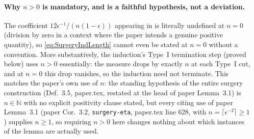 \begin{lemma}
  \paragraph{Why $n>0$ is mandatory, and is a faithful hypothesis, not a deviation.} The
  coefficient $12\epsilon^{-1}/(n(1-\epsilon))$ appearing in  is literally
  undefined at $n=0$ (division by zero in a context where the paper intends a genuine positive
  quantity), so \eqref{eq:SurgeryIndLength} cannot even be stated at $n=0$ without a convention. More
  substantively, the induction's Type~I termination step (proved below) uses
  $n>0$ essentially: the measure drops by exactly $n$ at each Type~I cut, and at $n=0$ this drop
  vanishes, so the induction need not terminate. This matches the paper's own use of $n$: the
  standing hypothesis of the entire surgery construction (Def.~3.5, paper.tex, restated at the head
  of paper Lemma~3.1) is $n \in \mathbb{N}$ with no explicit positivity clause stated, but every
  citing use of paper Lemma~3.1 (paper Cor.~3.2, \texttt{surgery-eta}, paper.tex line 628, with
  $n = \lceil \epsilon^{-2}\rceil \ge 1$) supplies $n \ge 1$, so requiring $n>0$ here changes nothing about
  which instances of the lemma are actually used.
\end{lemma}
